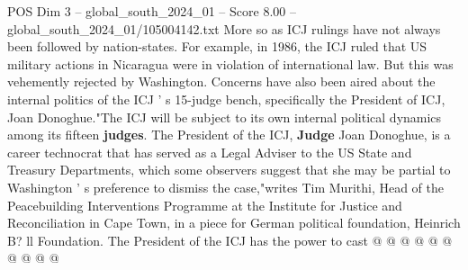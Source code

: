 \begin{textsample}{POS Dim 3 – global\_south\_2024\_01 – Score 8.00 – global\_south\_2024\_01/105004142.txt}
More so as ICJ rulings have not always been followed by nation-states.
For example, in 1986, the ICJ ruled that US military actions in Nicaragua were in violation of international law.
But this was vehemently rejected by Washington.
Concerns have also been aired about the internal politics of the ICJ ' s 15-judge bench, specifically the President of ICJ, Joan Donoghue."The ICJ will be subject to its own internal political dynamics among its fifteen \textbf{judges}.
The President of the ICJ, \textbf{Judge} Joan Donoghue, is a career technocrat that has served as a Legal Adviser to the US State and Treasury Departments, which some observers suggest that she may be partial to Washington ' s preference to dismiss the case,"writes Tim Murithi, Head of the Peacebuilding Interventions Programme at the Institute for Justice and Reconciliation in Cape Town, in a piece for German political foundation, Heinrich B? ll Foundation.
The President of the ICJ has the power to cast @ @ @ @ @ @ @ @ @ @

\end{textsample}
